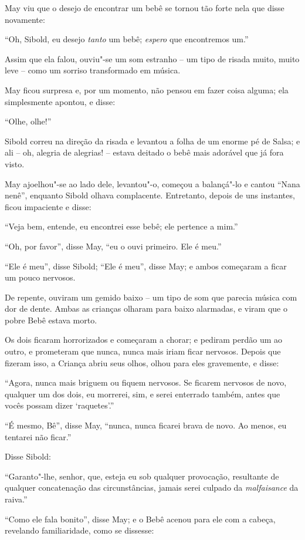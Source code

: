 May viu que o desejo de encontrar um bebê se tornou tão forte nela que
disse novamente:

``Oh, Sibold, eu desejo \emph{tanto} um bebê; \emph{espero} que
encontremos um.''

Assim que ela falou, ouviu"-se um som estranho -- um tipo de risada
muito, muito leve -- como um sorriso transformado em música.

May ficou surpresa e, por um momento, não pensou em fazer coisa alguma;
ela simplesmente apontou, e disse:

``Olhe, olhe!''

Sibold correu na direção da risada e levantou a folha de um enorme pé de
Salsa; e ali -- oh, alegria de alegrias! -- estava deitado o bebê mais
adorável que já fora visto.

May ajoelhou"-se ao lado dele, levantou"-o, começou a balançá"-lo e cantou
``Nana nenê'', enquanto Sibold olhava complacente. Entretanto, depois de
uns instantes, ficou impaciente e disse:

``Veja bem, entende, eu encontrei esse bebê; ele pertence a mim.''

``Oh, por favor'', disse May, ``eu o ouvi primeiro. Ele é meu.''

``Ele é meu'', disse Sibold; ``Ele é meu'', disse May; e ambos começaram
a ficar um pouco nervosos.

De repente, ouviram um gemido baixo -- um tipo de som que parecia música
com dor de dente. Ambas as crianças olharam para baixo alarmadas, e
viram que o pobre Bebê estava morto.

Os dois ficaram horrorizados e começaram a chorar; e pediram perdão um
ao outro, e prometeram que nunca, nunca mais iriam ficar nervosos.
Depois que fizeram isso, a Criança abriu seus olhos, olhou para eles
gravemente, e disse:

``Agora, nunca mais briguem ou fiquem nervosos. Se ficarem nervosos de novo,
qualquer um dos dois, eu morrerei, sim, e serei enterrado também, antes
que vocês possam dizer `raquetes'.''

``É mesmo, Bê'', disse May, ``nunca, nunca ficarei brava de novo. Ao
menos, eu tentarei não ficar.''

Disse Sibold:

``Garanto"-lhe, senhor, que, esteja eu sob qualquer provocação,
resultante de qualquer concatenação das circunstâncias, jamais serei
culpado da \emph{malfaisance} da raiva.''

``Como ele fala bonito'', disse May; e o Bebê acenou para ele com a
cabeça, revelando familiaridade, como se dissesse:

